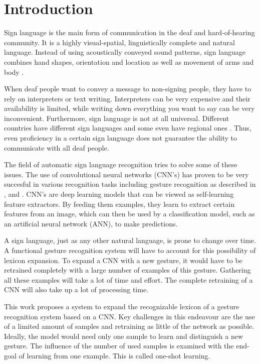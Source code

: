 \documentclass[twocolumn]{phdsymp} %
\begin{document}
\section{Introduction}
Sign language is the main form of communication in the deaf and hard-of-hearing community. It is a highly visual-spatial, linguistically complete and natural language. Instead of using acoustically conveyed sound patterns, sign language combines hand shapes, orientation and location as well as movement of arms and body \cite{buyens_gebarentaaltolken_2003}.
\par When deaf people want to convey a message to non-signing people, they have to rely on interpreters or text writing. Interpreters can be very expensive and their availability is limited, while writing down everything you want to say can be very inconvenient. Furthermore, sign language is not at all universal. Different countries have different sign languages and some even have regional ones \cite{VGT-standard}. Thus, even proficiency in a certain sign language does not guarantee the ability to communicate with all deaf people.
\par The field of automatic sign language recognition tries to solve some of these issues. The use of convolutional neural networks (CNN's) has proven to be very succesful in various recognition tasks including gesture recognition as described in \cite{wu_deep_2014}, \cite{cnn-ji} and \cite{lionel}. CNN's are deep learning models that can be viewed as self-learning feature extractors. By feeding them examples, they learn to extract certain features from an image, which can then be used by a classification model, such as an artificial neural network (ANN), to make predictions.
\par A sign language, just as any other natural language, is prone to change over time. A functional gesture recognition system will have to account for this possibility of lexicon expansion. To expand a CNN with a new gesture, it would have to be retrained completely with a large number of examples of this gesture. Gathering all these examples will take a lot of time and effort. The complete retraining of a CNN will also take up a lot of processing time.
\par This work proposes a system to expand the recognizable lexicon of a gesture recognition system based on a CNN. Key challenges in this endeavour are the use of a limited amount of samples and retraining as little of the network as possible. Ideally, the model would need only one sample to learn and distinguish a new gesture. The influence of the number of used samples is examined with the end-goal of learning from one example. This is called one-shot learning.
\end{document}
